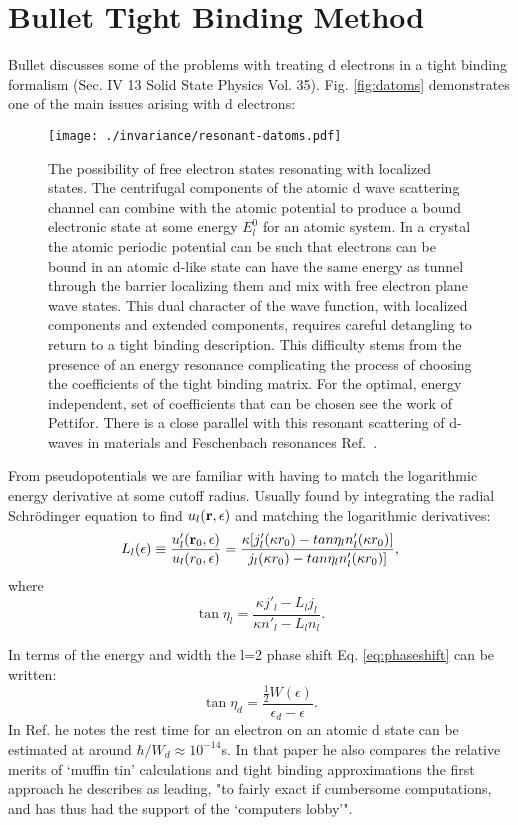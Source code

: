 \section{Bullet Tight Binding Method}
\label{sec:bullet}
Bullet discusses some of the problems with treating d electrons in a tight binding 
formalism (Sec. IV 13 Solid State Physics Vol. 35). Fig. \ref{fig:datoms} demonstrates
one of the main issues arising with d electrons:
%
\begin{figure}
\texttt{[image: ./invariance/resonant-datoms.pdf]}
\caption{The possibility of free electron states resonating with localized states.
The centrifugal components of the atomic d wave scattering channel can combine with
the atomic potential to produce a bound electronic state at some energy $E^{0}_{l}$ for an atomic system.
In a crystal the atomic periodic potential can be such that electrons can be bound in an
atomic d-like state can have the same energy as tunnel through the barrier localizing them and mix with free electron 
plane wave states. This dual character of the wave function, with localized components and extended components, requires careful 
detangling to return to a tight binding description. This difficulty stems from the presence of an energy resonance 
complicating the process of choosing the coefficients of the tight binding matrix. For the optimal, energy independent,
set of coefficients that can be chosen see the work of Pettifor. There is a close parallel with this resonant scattering of d-waves in materials
and Feschenbach resonances Ref.~\cite{chin10}.}
\end{figure}
%

From pseudopotentials we are familiar with having to match the logarithmic energy
derivative at some cutoff radius. Usually found by integrating the radial
Schr\"odinger equation to find $u_{l}({\bf r},\epsilon)$ and matching the logarithmic derivatives:
%
\begin{equation}
L_{l}(\epsilon) \equiv \frac{u'_{l}({\bf r}_{0},\epsilon)}{u_{l}(r_{0},\epsilon)} = \frac{\kappa[j'_{l}
(\kappa r_{0}) - tan \eta_{l} n'_{l}(\kappa r_{0})]} {j_{l}(\kappa r_{0}) - tan \eta_{l} n_{l}'(\kappa r_{0})]},
\end{equation}
%
where
\begin{equation}
\label{eq:phaseshift}
\tan \eta_{l} = \frac{\kappa j'_{l} - L_{l}j_{l}}{\kappa n'_{l} - L_{l}n_{l}}.
\end{equation}

In terms of the energy and width the l=2 phase shift Eq. \ref{eq:phaseshift} 
can be written:
%
\begin{equation}
\label{eq:dshift}
\tan \eta_{d} = \frac{\frac{1}{2}W(\epsilon)}{\epsilon_{d}-\epsilon}.
\end{equation}
%
In Ref. \cite{friedel73} he notes the rest time for an electron on an atomic d state 
can be estimated at around $\hbar/W_{d}\approx 10^{-14}$s. In that paper he also
compares the relative merits of `muffin tin' calculations and tight binding approximations
the first approach he describes as leading, "to fairly exact if cumbersome
computations, and has thus had the support of the `computers lobby'".


